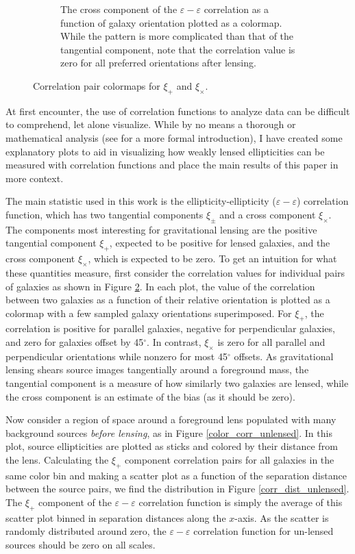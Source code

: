 \documentclass[%
 reprint,
 amsmath,amssymb,
 aps,nofootinbib
]{revtex4-1}
\begin{document}
\begin{figure}[!b]
\begin{subfigure}{0.425\textwidth}
        \captionsetup{justification=raggedright,singlelinecheck=false}
        \caption{The cross component of the $\varepsilon-\varepsilon$ correlation as a function of galaxy orientation plotted as a colormap. While the pattern is more complicated than that of the tangential component, note that the correlation value is zero for all preferred orientations after lensing.}
        \label{xix_colormap}
    \end{subfigure}
    \caption{Correlation pair colormaps for $\xi_+$ and $\xi_\times$.}
    \label{corr_colormaps}
\end{figure}

At first encounter, the use of correlation functions to analyze data can be difficult to comprehend, let alone visualize. While by no means a thorough or mathematical analysis (see \cite{correlation_functions} for a more formal introduction), I have created some explanatory plots to aid in visualizing how weakly lensed ellipticities can be measured with correlation functions and place the main results of this paper in more context.

The main statistic used in this work is the ellipticity-ellipticity ($\varepsilon-\varepsilon$) correlation function, which has two tangential components $\xi_\pm$ and a cross component $\xi_\times$. The components most interesting for gravitational lensing are the positive tangential component $\xi_+$, expected to be positive for lensed galaxies, and the cross component $\xi_\times$, which is expected to be zero. To get an intuition for what these quantities measure, first consider the correlation values for individual pairs of galaxies as shown in Figure \ref{corr_colormaps}. In each plot, the value of the correlation between two galaxies as a function of their relative orientation is plotted as a colormap with a few sampled galaxy orientations superimposed. For $\xi_+$, the correlation is positive for parallel galaxies, negative for perpendicular galaxies, and zero for galaxies offset by 45$^\circ$. In contrast, $\xi_\times$ is zero for all parallel and perpendicular orientations while nonzero for most 45$^\circ$ offsets. As gravitational lensing shears source images tangentially around a foreground mass, the tangential component is a measure of how similarly two galaxies are lensed, while the cross component is an estimate of the bias (as it should be zero).

Now consider a region of space around a foreground lens populated with many background sources \textit{before lensing}, as in Figure \ref{color_corr_unlensed}. In this plot, source ellipticities are plotted as sticks and colored by their distance from the lens. Calculating the $\xi_+$ component correlation pairs for all galaxies in the same color bin and making a scatter plot as a function of the separation distance between the source pairs, we find the distribution in Figure \ref{corr_dist_unlensed}. The $\xi_+$ component of the $\varepsilon-\varepsilon$ correlation function is simply the average of this scatter plot binned in separation distances along the $x$-axis. As the scatter is randomly distributed around zero, the $\varepsilon-\varepsilon$ correlation function for un-lensed sources should be zero on all scales.
\end{document}

